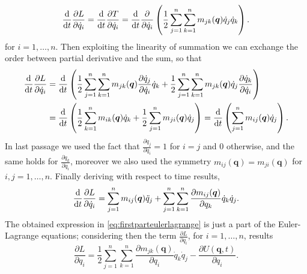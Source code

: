 		\begin{equation*}
			\frac{\mathop{}\!\mathrm{d}}{\mathop{}\!\mathrm{d} t}\frac{\partial L}{\partial \dot{q}_{i}} = \frac{\mathop{}\!\mathrm{d}}{\mathop{}\!\mathrm{d} t}\frac{\partial T}{\partial \dot{q}_{i}} = \frac{\mathop{}\!\mathrm{d}}{\mathop{}\!\mathrm{d} t}\frac{\partial}{\partial\dot{q}_{i}}\left(\frac{1}{2}\sum_{j=1}^{n}\sum_{k=1}^{n}m_{jk}(\bm{q})\dot{q}_{j}\dot{q}_{k}\right).
		\end{equation*}
		for $i = 1,\dots,n$. Then exploiting the linearity of summation we can exchange the order between partial derivative and the sum, so that 
		\begin{subequations}
			\label{eq:blekinetic}
			\begin{align}
				\frac{\diff}{\diff t}\frac{\partial L}{\partial \dot{q}_{i}} &= \frac{\diff}{\diff t}\left(\frac{1}{2}\sum_{j=1}^{n}\sum_{k=1}^{n}m_{jk}(\bm{q})\frac{\partial\dot{q}_{j}}{\partial\dot{q}_{i}}\dot{q}_{k}+\frac{1}{2}\sum_{j=1}^{n}\sum_{k=1}^{n}m_{jk}(\bm{q})\dot{q}_{j}\frac{\partial\dot{q}_{k}}{\partial\dot{q}_{i}}\right) \\
				&=\frac{\diff}{\diff t}\left(\frac{1}{2}\sum_{k=1}^{n}m_{ik}(\bm{q})\dot{q}_{k}+\frac{1}{2}\sum_{j=1}^{n}m_{ji}(\bm{q})\dot{q}_{j}\right) = \frac{\diff}{\diff t}\left(\sum_{j=1}^{n}m_{ij}(\bm{q})\dot{q}_{j}\right).
			\end{align}
		\end{subequations}
		In last passage we used the fact that $\frac{\partial\dot{q}_{j}}{\partial\dot{q}_{i}} = 1$ for $i = j$ and $0$ otherwise, and the same holds for $\frac{\partial\dot{q}_{k}}{\partial\dot{q}_{i}}$, moreover we also used the symmetry $m_{ij}(\bm{q})=m_{ji}(\bm{q})$ for $i,j = 1,\dots,n$. Finally deriving with respect to time results, 
		\begin{equation}
			\label{eq:firstparteulerlagrange}
			\frac{\mathop{}\!\mathrm{d}}{\mathop{}\!\mathrm{d} t}\frac{\partial L}{\partial\dot{q}_{i}} = \sum_{j=1}^{n}m_{ij}(\bm{q})\ddot{q}_{j} + \sum_{j=1}^{n}\sum_{k=1}^{n}\frac{\partial m_{ij}(\bm{q})}{\partial q_{k}}\dot{q}_{k}\dot{q}_{j}.
		\end{equation}
		The obtained expression in \cref{eq:firstparteulerlagrange} is just a part of the Euler-Lagrange equations; considering then the term $\frac{\partial L}{\partial q_{i}}$, for $i=1,\dots,n$, results 
		\begin{equation}
			\label{eq:secondparteulerlagrange}
			\frac{\partial L}{\partial q_{i}} = \frac{1}{2} \sum_{j=1}^{n}\sum_{k=1}^{n}\frac{\partial m_{jk}(\bm{q})}{\partial q_{i}}\dot{q}_{k}\dot{q}_{j} -\frac{\partial U(\bm{q},t)}{\partial q_{i}}.
		\end{equation}
